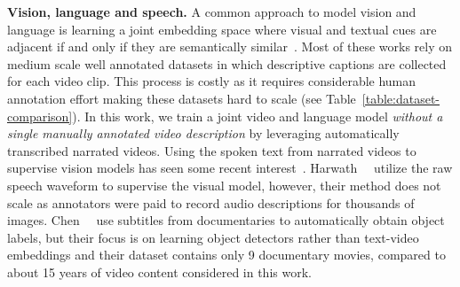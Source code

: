 \documentclass[10pt,twocolumn,letterpaper]{article}
\begin{document}
\vspace{1mm}
\noindent
\textbf{Vision, language and speech.}
A common approach to model vision and language is learning a joint embedding space where visual and textual cues are adjacent if and only if they are semantically similar~\cite{chowdhury2018webly,dong19dual,gong14multi,gong14improving,klein15associating,miech18learning,mithun2018learning,pan16jointly,plummer2017enhancing,xu2015jointly,wang2018learning,wang2016learning,wu2017sampling}.
Most of these works rely on medium scale well annotated datasets in which descriptive captions are collected for each video clip.
This process is costly as it requires considerable human annotation effort making these datasets hard to scale (see Table~\ref{table:dataset-comparison}).
In this work, we train a joint video and language model \textit{without a single manually annotated video description} by leveraging automatically transcribed narrated videos.
Using the spoken text from narrated videos to supervise vision models has seen some recent interest~\cite{alayrac16unsupervised,chen17discover,harwath18jointly, malmaud15what,sanabria18how2,yu14instructional}.
Harwath~\etal~\cite{harwath18jointly} utilize the raw speech waveform to supervise the visual model, however, their method does not scale as annotators were paid to record audio descriptions for thousands of images.
Chen~\etal~\cite{chen17discover} use subtitles from documentaries to automatically obtain object labels, but their focus is on learning object detectors rather than text-video embeddings and their dataset contains only 9 documentary movies, compared to about 15 years of video content considered in this work. 
\end{document}
